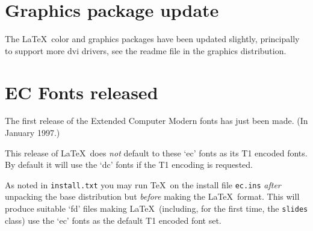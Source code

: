 \documentclass{ltnews}
\providecommand\cls[1]{\texttt{#1}}
\providecommand\file[1]{\texttt{#1}}
\begin{document}
\section{Graphics package update}
The \LaTeX\ color and graphics packages have been updated slightly,
principally to support more dvi drivers, see the readme file in the
\textsf{graphics} distribution.

\section{EC Fonts released}
The first release of the Extended Computer Modern fonts has just been
made. (In January 1997.)

This release of \LaTeX\ does \emph{not} default to these `ec' fonts
as its T1 encoded fonts. By default it will
use the `dc' fonts if the T1 encoding is requested.

As noted in \file{install.txt} you may run \TeX\ on the install file
\file{ec.ins} \emph{after} unpacking the base distribution but
\emph{before} making the \LaTeX\ format. This will produce
suitable `fd' files making \LaTeX\ (including, for the first time, the
\cls{slides} class) use the `ec' fonts as the default T1 encoded
font set.
\end{document}
